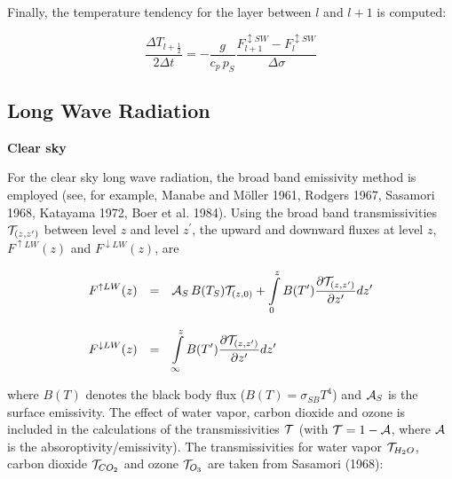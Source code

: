Finally, the temperature tendency for the layer between
$l$ and $l+1$ is computed:

\begin{equation}
\frac{\Delta T_{l+\frac{1}{2}}}{2\Delta t} = -
\frac{g}{c_p
\, p_S}\frac{F_{l+1}^{\updownarrow SW}-F_{l}^{\updownarrow SW}}{\Delta
\sigma}   
\end{equation}

\newpage

\subsection{Long Wave Radiation}

{\bf Clear sky}

For the clear sky long wave radiation, the broad band
emissivity method is employed (see, for example,
Manabe and M\"oller 1961, Rodgers 1967, Sasamori
1968, Katayama 1972, Boer et al. 1984).
Using the broad band transmissivities
${\cal T}_{(z,z^{\prime})}$ between level $z$ and level
$z^{\prime}$, the upward and downward fluxes at
level
$z$, $F^{\uparrow LW}(z)$ and
$F^{\downarrow LW}(z)$, are

\begin{equation}
\begin{array}{rcl}
\displaystyle F^{\uparrow LW}(z) & = &\displaystyle  {\cal A}_S \, B(T_S)
{\cal T}_{(z,0)} +
\int\limits_0^z B(T^{\prime}) \frac{\partial
{\cal T}_{(z,z^{\prime})}}{\partial z^{\prime}} d z^{\prime}
\\
& & \\
\displaystyle F^{\downarrow LW}(z) & = & \displaystyle \int\limits_{\infty}^z
B(T^{\prime}) \frac{\partial
{\cal T}_{(z,z^{\prime})}}{\partial z^{\prime}} d z^{\prime} 
\end{array}
\end{equation}


where $B(T)$ denotes the black body flux ($ B(T) = \sigma_{SB}
T^4$) and
${\cal A}_S$ is the surface emissivity. The effect
of water vapor, carbon dioxide and ozone is included in the
calculations of the transmissivities ${\cal T}$
(with ${\cal T} = 1 - {\cal A}$, where ${\cal A}$ is the
absoroptivity/emissivity). The transmissivities for water vapor 
${\cal T}_{H_2O}$, carbon dioxide ${\cal T}_{CO_2}$ and 
ozone ${\cal T}_{O_3}$ are taken from Sasamori (1968):

